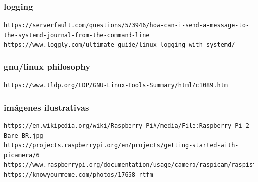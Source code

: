 \documentclass[10pt,a4paper]{article}
\begin{document}
\subsubsection{logging}

\begin{scriptsize}
\begin{verbatim}
https://serverfault.com/questions/573946/how-can-i-send-a-message-to-the-systemd-journal-from-the-command-line
https://www.loggly.com/ultimate-guide/linux-logging-with-systemd/
\end{verbatim}
\end{scriptsize}

\subsubsection{gnu/linux philosophy}

\begin{scriptsize}
\begin{verbatim}
https://www.tldp.org/LDP/GNU-Linux-Tools-Summary/html/c1089.htm
\end{verbatim}
\end{scriptsize}

\subsubsection{im\'agenes ilustrativas}

\begin{scriptsize}
\begin{verbatim}
https://en.wikipedia.org/wiki/Raspberry_Pi#/media/File:Raspberry-Pi-2-Bare-BR.jpg
https://projects.raspberrypi.org/en/projects/getting-started-with-picamera/6
https://www.raspberrypi.org/documentation/usage/camera/raspicam/raspistill.md
https://knowyourmeme.com/photos/17668-rtfm
\end{verbatim}
\end{scriptsize}

\newpage
\end{document}
